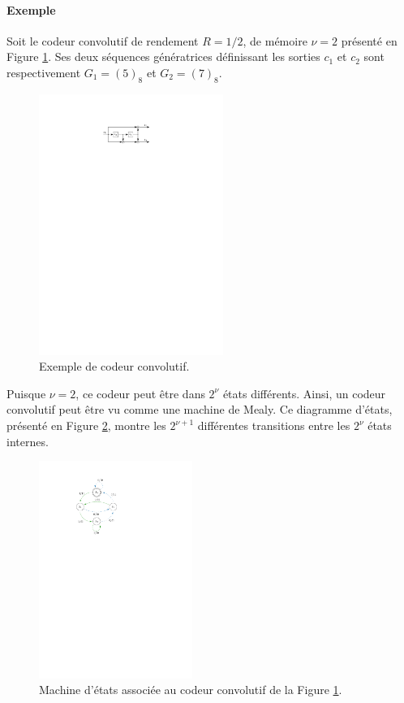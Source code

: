 \paragraph*{Exemple}
Soit le codeur convolutif de rendement $R=1/2$, de mémoire $\nu = 2$ présenté en Figure \ref{fig:encConv}. Ses deux 
séquences génératrices définissant les sorties $c_1$ et $c_2$ sont respectivement $G_1 = (5)_8$ et $G_2 = (7)_8$.
\begin{figure}[!b]
	\centering
	\includegraphics[width=6cm]{main/ch1_fig/encConv.pdf}
	\caption{\label{fig:encConv} Exemple de codeur convolutif.}
\end{figure}
Puisque $\nu = 2$, ce codeur peut être dans $2^\nu$ états différents. Ainsi, un codeur convolutif peut être vu comme une 
machine de Mealy. Ce diagramme d'états, présenté en Figure \ref{fig:stateMachine}, montre les  $2^{\nu+1}$ 
différentes transitions entre les $2^{\nu}$ états internes. 
\begin{figure}[!t]
	\centering
	\includegraphics[width=5cm]{main/ch1_fig/stateMachine.pdf}
	\caption{\label{fig:stateMachine} Machine d'états associée au codeur convolutif de la Figure \ref{fig:encConv}.}
\end{figure}

